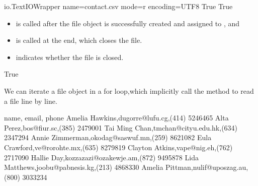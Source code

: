 \documentclass[letterpaper,10pt,english]{sphinxmanual}
\begin{document}
\begin{sphinxVerbatim}[commandchars=\\\{\}]
\PYGZlt{}\PYGZus{}io.TextIOWrapper name=\PYGZsq{}contact.csv\PYGZsq{} mode=\PYGZsq{}r\PYGZsq{} encoding=\PYGZsq{}UTF\PYGZhy{}8\PYGZsq{}\PYGZgt{}
True
True
\end{sphinxVerbatim}
\begin{itemize}
\item {} 
 is called after the file object is successfully created and assigned to , and

\item {} 
 is called at the end, which closes the file.

\item {} 
 indicates whether the file is closed.

\end{itemize}

\begin{sphinxVerbatim}[commandchars=\\\{\}]
\end{sphinxVerbatim}

\begin{sphinxVerbatim}[commandchars=\\\{\}]
True
\end{sphinxVerbatim}

We can iterate a file object in a for loop,which implicitly call the method  to read a file line by line.

\begin{sphinxVerbatim}[commandchars=\\\{\}]
   
       
         

 
\end{sphinxVerbatim}

\begin{sphinxVerbatim}[commandchars=\\\{\}]
name, email, phone
Amelia Hawkins,dugorre@lufu.cg,(414) 524\PYGZhy{}6465
Alta Perez,bos@fiur.sc,(385) 247\PYGZhy{}9001
Tai Ming Chan,tmchan@cityu.edu.hk,(634) 234\PYGZhy{}7294
Annie Zimmerman,okodag@saswuf.mn,(259) 862\PYGZhy{}1082
Eula Crawford,ve@rorohte.mx,(635) 827\PYGZhy{}9819
Clayton Atkins,vape@nig.eh,(762) 271\PYGZhy{}7090
Hallie Day,kozzazazi@ozakewje.am,(872) 949\PYGZhy{}5878
Lida Matthews,joobu@pabnesis.kg,(213) 486\PYGZhy{}8330
Amelia Pittman,nulif@uposzag.au,(800) 303\PYGZhy{}3234
\end{sphinxVerbatim}
\end{document}
